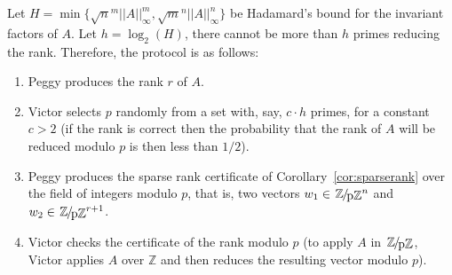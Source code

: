 \documentclass{article}
\newcommand{\Z}{\ensuremath{\mathbb Z}}\newcommand{\ZZ}{\Z}
\newcommand{\Zp}{\leavevmode\kern.1em\raise.0ex
  \hbox{\ensuremath{\mathbb{Z}}}\kern-.1em
  /\kern-.15em\lower.3ex\hbox{p\mbox{\ensuremath{\mathbb{Z}}}}\xspace}
\begin{document}
 
Let $H=\min\{\sqrt{n}^m ||A||_\infty^m,\sqrt{m}^n ||A||_\infty^n\}$ be
Hadamard's bound for the invariant factors of $A$. Let $h=\log_2(H)$, there
cannot be more than $h$ primes reducing the 
rank. Therefore, the protocol is as follows:
\begin{enumerate}
\item Peggy produces the rank $r$ of $A$.
\item Victor selects $p$ randomly from a set with, say, $c\cdot h$ primes, for a
  constant $c>2$ (if the rank is correct then the probability that the rank of
  $A$ will be reduced modulo $p$ is then less than $1/2$).
\item Peggy produces the sparse rank certificate of
  Corollary~\ref{cor:sparserank} over the field of integers modulo $p$, that is,
  two vectors $w_1\in \Zp^n$ and $w_2\in\Zp^{r+1}$.
\item Victor checks the certificate of the rank modulo $p$ (to apply $A$ in
  $\Zp$, Victor applies $A$ over $\Z$ and then reduces the resulting vector
  modulo $p$).
\end{enumerate}
\end{document}
